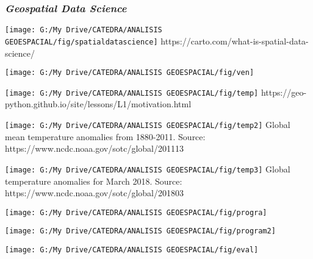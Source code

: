 \documentclass[12pt]{beamer}
\begin{document}
\begin{frame}
\frametitle{\emph{Geospatial Data Science}}
\centering
	\texttt{[image: G:/My Drive/CATEDRA/ANALISIS GEOESPACIAL/fig/spatialdatascience]}\vfill
	\tiny{https://carto.com/what-is-spatial-data-science/}
\end{frame}
\begin{frame}
\centering
	\texttt{[image: G:/My Drive/CATEDRA/ANALISIS GEOESPACIAL/fig/ven]}
\end{frame}
\begin{frame}
\centering
	\texttt{[image: G:/My Drive/CATEDRA/ANALISIS GEOESPACIAL/fig/temp]}\vfill
\tiny{https://geo-python.github.io/site/lessons/L1/motivation.html}
\end{frame}
\begin{frame}
\centering
	\texttt{[image: G:/My Drive/CATEDRA/ANALISIS GEOESPACIAL/fig/temp2]}\vfill
\tiny{Global mean temperature anomalies from 1880-2011. Source: https://www.ncdc.noaa.gov/sotc/global/201113}
\end{frame}
\begin{frame}
\centering
	\texttt{[image: G:/My Drive/CATEDRA/ANALISIS GEOESPACIAL/fig/temp3]}\vfill
\tiny{Global temperature anomalies for March 2018. Source: https://www.ncdc.noaa.gov/sotc/global/201803}
\end{frame}
\begin{frame}
\centering
	\texttt{[image: G:/My Drive/CATEDRA/ANALISIS GEOESPACIAL/fig/progra]}
\end{frame}
\begin{frame}
\centering
	\texttt{[image: G:/My Drive/CATEDRA/ANALISIS GEOESPACIAL/fig/program2]}
\end{frame}
\begin{frame}
\centering
	\texttt{[image: G:/My Drive/CATEDRA/ANALISIS GEOESPACIAL/fig/eval]}
\end{frame}
\end{document}
